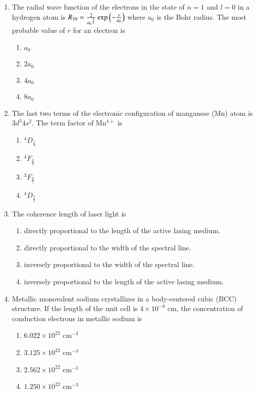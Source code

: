 \documentclass[journal,9pt,onecolumn]{IEEEtran}
\begin{document}
\begin{enumerate}
\item The radial wave function of the electrons in the state of $n=1$ and $l=0$ in a hydrogen atom is $R_{10}=\frac{2}{{a_{0}}^{\frac{3}{2}}}\exp\left(-\frac{r}{a_{0}}\right)$ where $a_{0}$ is the Bohr radius. The most probable value of $r$ for an electron is
\begin{multicols}{4}
\begin{enumerate}
    \item $a_0$
    \item $2a_0$
    \item $4a_0$
    \item $8a_0$
\end{enumerate}
\end{multicols}




\item  The last two terms of the electronic configuration of manganese (Mn) atom is $3d^{5}4s^{2}$. The term factor of Mn$^{4+}$ is
\begin{multicols}{4}
\begin{enumerate}
    \item $^{4}D_{\frac{1}{2}}$
    \item $^{4}F_{\frac{3}{2}}$
    \item $^{3}F_{\frac{9}{2}}$
    \item $^{4}D_{\frac{7}{2}}$
\end{enumerate}
\end{multicols}



\item The coherence length of laser light is
    
\begin{enumerate}
        \item directly proportional to the length of the active lasing medium.
        \item directly proportional to the width of the spectral line.
        \item inversely proportional to the width of the spectral line.
        \item inversely proportional to the length of the active lasing medium.
\end{enumerate}


\item Metallic monovalent sodium crystallizes in a body-centered cubic (BCC) structure. If the length of the unit cell is $4\times10^{-8}$ cm, the concentration of conduction electrons in metallic sodium is
\begin{multicols}{4}
\begin{enumerate}
    \item $6.022\times10^{22}$ cm$^{-3}$
        \item $3.125\times10^{22}$ cm$^{-3}$
        \item $2.562\times10^{22}$ cm$^{-3}$
        \item $1.250\times10^{22}$ cm$^{-3}$
\end{enumerate}
\end{multicols}


\end{enumerate}
\end{document}
